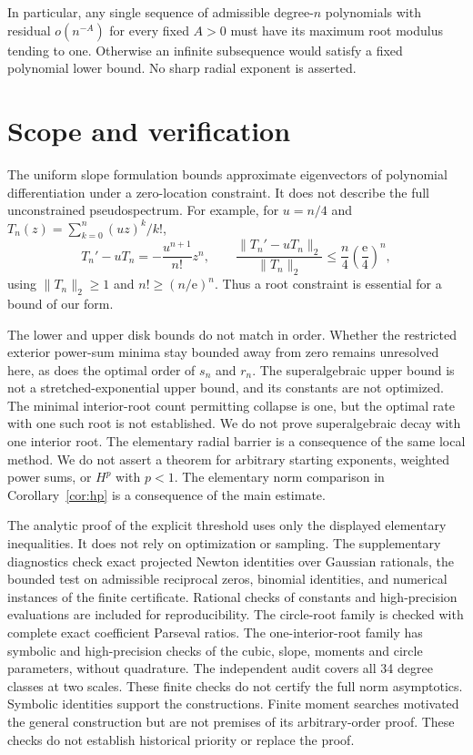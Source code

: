 \documentclass[11pt]{article}
\theoremstyle{remark}\newtheorem{remark}[theorem]{Remark}
\newcommand{\norm}[1]{\lVert #1\rVert}
\newcommand{\ee}{\mathrm e}
\begin{document}
In particular, any single sequence of admissible degree-\(n\)
polynomials with residual \(o(n^{-A})\) for every fixed \(A>0\)
must have its maximum root modulus tending to one. Otherwise an
infinite subsequence would satisfy a fixed polynomial lower bound.
No sharp radial exponent is asserted.

\section{Scope and verification}
The uniform slope formulation bounds approximate eigenvectors of
polynomial differentiation under a zero-location constraint.
It does not describe the full unconstrained pseudospectrum.
For example, for \(u=n/4\) and
\(T_n(z)=\sum_{k=0}^n(uz)^k/k!\),
\[
 T_n'-uT_n=-\frac{u^{n+1}}{n!}z^n,\qquad
 \frac{\norm{T_n'-uT_n}_2}{\norm{T_n}_2}
       \le\frac n4\left(\frac{\ee}{4}\right)^n,
\]
using \(\norm{T_n}_2\ge1\) and \(n!\ge(n/\ee)^n\).
Thus a root constraint is essential for a bound of our form.

The lower and upper disk bounds do not match in order.
Whether the restricted exterior power-sum minima stay bounded
away from zero remains unresolved here, as does the optimal order
of \(s_n\) and \(r_n\).
The superalgebraic upper bound is not a stretched-exponential upper
bound, and its constants are not optimized. The minimal interior-root
count permitting collapse is one, but the optimal rate with one such
root is not established. We do not prove superalgebraic decay with
one interior root. The elementary radial
barrier is a consequence of the same local method.
We do not assert a theorem for arbitrary starting exponents,
weighted power sums, or \(H^p\) with \(p<1\).
The elementary norm comparison in Corollary~\ref{cor:hp} is a
consequence of the main estimate.

The analytic proof of the explicit threshold uses only the displayed
elementary inequalities. It does not rely on optimization or sampling.
The supplementary diagnostics check exact projected Newton identities
over Gaussian rationals, the bounded test on admissible reciprocal
zeros, binomial identities, and numerical instances of the finite
certificate. Rational checks of constants and high-precision
evaluations are included for reproducibility. The circle-root family
is checked with complete exact coefficient Parseval ratios. The
one-interior-root family has symbolic and high-precision checks of
the cubic, slope, moments and circle parameters, without quadrature.
The independent audit covers all 34 degree classes at two scales.
These finite checks do not certify the full norm asymptotics.
Symbolic identities support the constructions. Finite moment
searches motivated the general construction but are not premises
of its arbitrary-order proof.
These checks do not establish historical priority or replace the proof.
\end{document}
